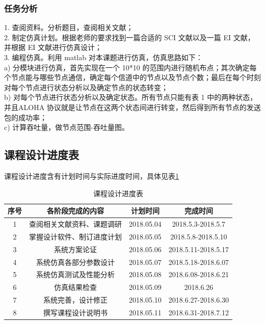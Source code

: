 \documentclass{article}
\begin{document}
	\subsubsection{任务分析}
	1.	查阅资料。分析题目，查阅相关文献；\\
	2.	制定仿真计划。根据老师的要求找到一篇合适的 SCI 文献以及一篇 EI 文献，并根据 EI 文献进行仿真设计；\\
	3.	编程仿真。利用 matlab 对本课题进行仿真，仿真思路如下：\\
	a)	分模块进行仿真，首先实现在一个 10*10 的范围内进行随机布点；其次确定每个节点能与哪些节点通信，确定每个信道中的节点以及节点个数；最后在每个时刻对每个节点进行状态分析以及确定节点的状态转变； \\
	b)	对每个节点进行状态分析以及确定状态。所有节点只能有表 1 中的两种状态，并且ALOHA 协议就是让节点在这两个状态间进行转变，然后得到所有节点的发送包的成功率；\\
	c)	计算吞吐量，做节点范围-吞吐量图。
	
	\subsection{课程设计进度表}
	课程设计进度含有计划时间与实际进度时间，具体见表\ref{table-2}
	\begin{table}[htbp]
		\centering
		\caption{课程设计进度表}
		\label{table-2}
		\begin{tabular}{|c|c|c|c|}
		\hline 
		序号 & 各阶段完成的内容 & 计划时间 & 完成时间\\
		\hline
		1 & 查阅相关文献资料、课题调研 &	2018.05.04 & 2018.5.3-2018.5.7 \\
		\hline
		2 & 掌握设计软件、制订进度计划 & 2018.05.05 & 2018.5.8-2018.5.10\\
		\hline
		3 & 系统方案论证 & 2018.05.06 & 2018.5.11-2018.5.17\\
		\hline
		4 & 系统仿真各部分参数设计 & 2018.05.07 & 2018.5.18-2018.6.07\\
		\hline
		5 & 系统仿真测试及性能分析 & 2018.05.08 & 2018.6.08-2018.6.21\\
		\hline
		6 & 仿真结果检查 & 2018.05.09	 & 2018.6.26\\
		\hline
		7 & 系统完善，设计修正 & 2018.05.10 & 2018.6.27-2018.6.30\\
		\hline
		8 & 撰写课程设计说明书 & 2018.05.11  &  2018.6.31-2018.7.12\\
		\hline
		\end{tabular}
	\end{table}
	
\end{document}
